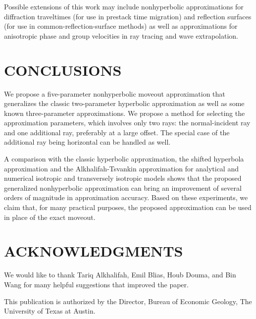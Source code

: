 Possible extensions of this work may include nonhyperbolic
approximations for diffraction traveltimes (for use in prestack time
migration) and reflection surfaces (for use in
common-reflection-surface methods) as well as approximations for
anisotropic phase and group velocities in ray tracing and wave
extrapolation.


\section{CONCLUSIONS}

We propose a five-parameter nonhyperbolic moveout approximation that
generalizes the classic two-parameter hyperbolic approximation as well
as some known three-parameter approximations. We propose a method for
selecting the approximation parameters, which involves only two rays:
the normal-incident ray and one additional ray, preferably at a large
offset. The special case of the additional ray being horizontal can be
handled as well.

A comparison with the classic hyperbolic approximation, the shifted
hyperbola approximation and the Alkhalifah-Tsvankin approximation for
analytical and numerical isotropic and transversely isotropic models
shows that the proposed generalized nonhyperbolic approximation can
bring an improvement of several orders of magnitude in approximation
accuracy. Based on these experiments, we claim that, for many
practical purposes, the proposed approximation can be used in place of
the exact moveout.

\section{ACKNOWLEDGMENTS}

We would like to thank Tariq Alkhalifah, Emil Blias, Houb Douma, and
Bin Wang for many helpful suggestions that improved the paper.

This publication is authorized by the Director, Bureau 
of Economic Geology, The University of Texas at Austin.

